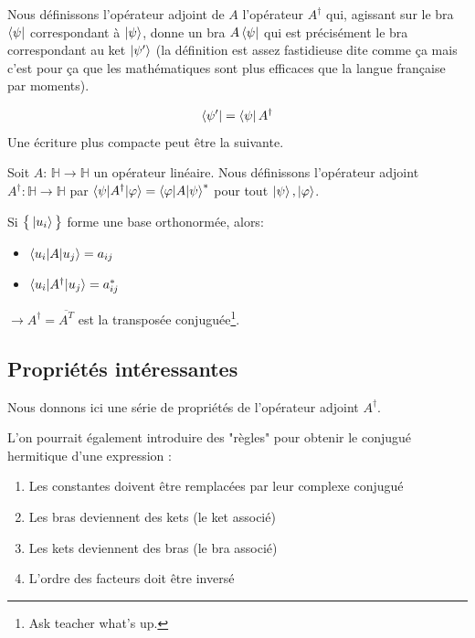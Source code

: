 \documentclass[../notesdecours.tex]{subfiles}
\begin{document}
Nous définissons l'opérateur adjoint de $A$ l'opérateur $A^\dagger$ qui, agissant sur le bra $\bra \psi$ correspondant à $\ket \psi$, donne un bra $A\bra {\psi}$ qui est précisément le bra correspondant au ket $\ket{\psi '}$ (la définition est assez fastidieuse dite comme ça mais c'est pour ça que les mathématiques sont plus efficaces que la langue française par moments).

$$\bra{\psi '} = \bra{\psi} A^\dagger$$
Une écriture plus compacte peut être la suivante.
\begin{definition} Soit $A$: $\mathbb{H} \rightarrow \mathbb{H}$ un opérateur linéaire. Nous définissons l'opérateur adjoint $A^\dag : \mathbb{H} \rightarrow \mathbb{H}$ par $\braket{\psi|A^\dag|\varphi} = \braket{\varphi|A|\psi}^*$ pour tout $\ket{\psi},\ket{\varphi}$. \end{definition}

Si $\big\{\ket{u_i}\big\}$ forme une base orthonormée, alors:
\begin{itemize}
\item $\braket{u_i|A|u_j} = a_{ij}$
\item $\braket{u_i|A^\dag|u_j} = a^*_{ij}$
\end{itemize}
$\rightarrow A^\dag = \overline{A^T}$ est la transposée conjuguée\footnote{Ask teacher what's up.}.\\
\subsection{Propriétés intéressantes}
Nous donnons ici une série de propriétés de l'opérateur adjoint $A^\dag$.
\begin{center}
\end{center}
L'on pourrait également introduire des "règles" pour obtenir le conjugué hermitique d'une expression :
\begin{enumerate}
	\item Les constantes doivent être remplacées par leur complexe conjugué
	\item Les bras deviennent des kets (le ket associé)
	\item Les kets deviennent des bras (le bra associé)
	\item L'ordre des facteurs doit être inversé
\end{enumerate}
\end{document}
